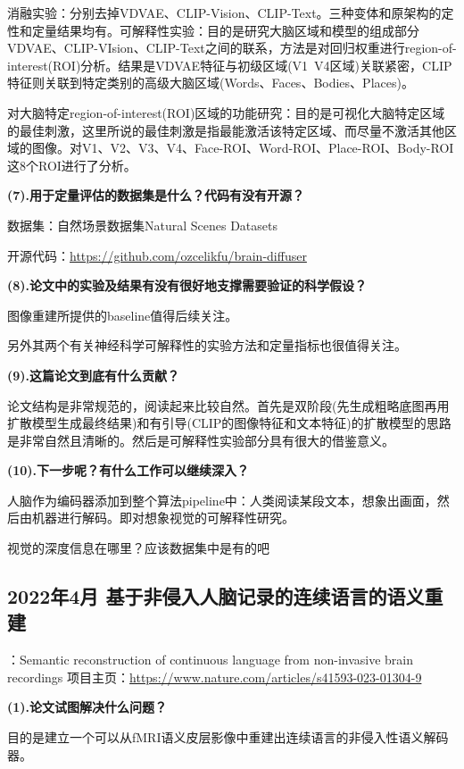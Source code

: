 \documentclass[12pt, a4paper, oneside]{ctexart}
\begin{document}
    消融实验：分别去掉VDVAE、CLIP-Vision、CLIP-Text。三种变体和原架构的定性和定量结果均有。可解释性实验：目的是研究大脑区域和模型的组成部分VDVAE、CLIP-VIsion、CLIP-Text之间的联系，方法是对回归权重进行region-of-interest(ROI)分析。结果是VDVAE特征与初级区域(V1~V4区域)关联紧密，CLIP特征则关联到特定类别的高级大脑区域(Words、Faces、Bodies、Places)。

    对大脑特定region-of-interest(ROI)区域的功能研究：目的是可视化大脑特定区域的最佳刺激，这里所说的最佳刺激是指最能激活该特定区域、而尽量不激活其他区域的图像。对V1、V2、V3、V4、Face-ROI、Word-ROI、Place-ROI、Body-ROI这8个ROI进行了分析。

    \noindent\textbf{(7).用于定量评估的数据集是什么？代码有没有开源？}

    数据集：自然场景数据集Natural Scenes Datasets\cite{Allen2022}

    开源代码：\url{https://github.com/ozcelikfu/brain-diffuser}

    \noindent\textbf{(8).论文中的实验及结果有没有很好地支撑需要验证的科学假设？}

    图像重建所提供的baseline值得后续关注。

    另外其两个有关神经科学可解释性的实验方法和定量指标也很值得关注。

    \noindent\textbf{(9).这篇论文到底有什么贡献？}

    论文结构是非常规范的，阅读起来比较自然。首先是双阶段(先生成粗略底图再用扩散模型生成最终结果)和有引导(CLIP的图像特征和文本特征)的扩散模型的思路是非常自然且清晰的。然后是可解释性实验部分具有很大的借鉴意义。

    \noindent\textbf{(10).下一步呢？有什么工作可以继续深入？}

    人脑作为编码器添加到整个算法pipeline中：人类阅读某段文本，想象出画面，然后由机器进行解码。即对想象视觉的可解释性研究。

    视觉的深度信息在哪里？应该数据集中是有的吧

    \subsection{2022年4月 基于非侵入人脑记录的连续语言的语义重建\cite{tang2023}}
    ：Semantic reconstruction of continuous language from non-invasive brain recordings
    项目主页：\url{https://www.nature.com/articles/s41593-023-01304-9}

    \noindent\textbf{(1).论文试图解决什么问题？}

    目的是建立一个可以从fMRI语义皮层影像中重建出连续语言的非侵入性语义解码器。
\end{document}
